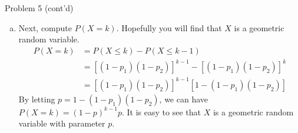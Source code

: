 \documentclass{beamer}
\begin{document}
\begin{frame}{Problem 5 (cont'd)}
    \begin{enumerate}[(c)]
        \item Next, compute $P(X = k)$. Hopefully you will find that $X$ is a geometric random variable.
        \begin{align*}
        P(X=k) &= P(X\leq k)- P(X\leq k-1)\\
        & = \left[(1-p_1)(1-p_2)\right]^{k-1}-\left[(1-p_1)(1-p_2)\right]^k\\
        & = \left[(1-p_1)(1-p_2)\right]^{k-1}\left[1-(1-p_1)(1-p_2)\right]
        \end{align*}
        By letting $ p = 1-(1-p_1)(1-p_2)$, we can have $P(X=k) = (1-p)^{k-1}p$. It is easy to see that $X$ is a geometric random variable with parameter $p$.
    \end{enumerate}
\end{frame}
\end{document}
